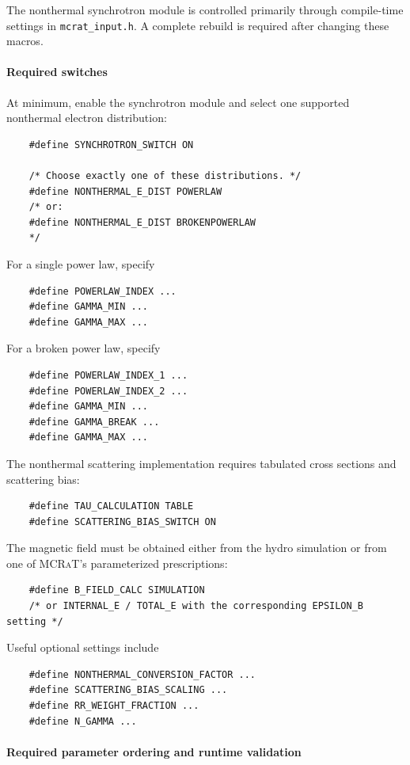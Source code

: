 \documentclass[12pt,a4paper]{article}
\newcommand{\code}[1]{\texttt{#1}}
\newcommand{\mcrat}{\textsc{MCRaT}}
\begin{document}
The nonthermal synchrotron module is controlled primarily through
compile-time settings in \code{mcrat\_input.h}. A complete rebuild is
required after changing these macros.

\paragraph{Required switches}

At minimum, enable the synchrotron module and select one supported
nonthermal electron distribution:
\begin{verbatim}
	#define SYNCHROTRON_SWITCH ON
	
	/* Choose exactly one of these distributions. */
	#define NONTHERMAL_E_DIST POWERLAW
	/* or:
	#define NONTHERMAL_E_DIST BROKENPOWERLAW
	*/
\end{verbatim}

For a single power law, specify
\begin{verbatim}
	#define POWERLAW_INDEX ...
	#define GAMMA_MIN ...
	#define GAMMA_MAX ...
\end{verbatim}

For a broken power law, specify
\begin{verbatim}
	#define POWERLAW_INDEX_1 ...
	#define POWERLAW_INDEX_2 ...
	#define GAMMA_MIN ...
	#define GAMMA_BREAK ...
	#define GAMMA_MAX ...
\end{verbatim}

The nonthermal scattering implementation requires tabulated cross
sections and scattering bias:
\begin{verbatim}
	#define TAU_CALCULATION TABLE
	#define SCATTERING_BIAS_SWITCH ON
\end{verbatim}

The magnetic field must be obtained either from the hydro simulation or
from one of \mcrat{}'s parameterized prescriptions:
\begin{verbatim}
	#define B_FIELD_CALC SIMULATION
	/* or INTERNAL_E / TOTAL_E with the corresponding EPSILON_B setting */
\end{verbatim}

Useful optional settings include
\begin{verbatim}
	#define NONTHERMAL_CONVERSION_FACTOR ...
	#define SCATTERING_BIAS_SCALING ...
	#define RR_WEIGHT_FRACTION ...
	#define N_GAMMA ...
\end{verbatim}

\paragraph{Required parameter ordering and runtime validation}
\end{document}
